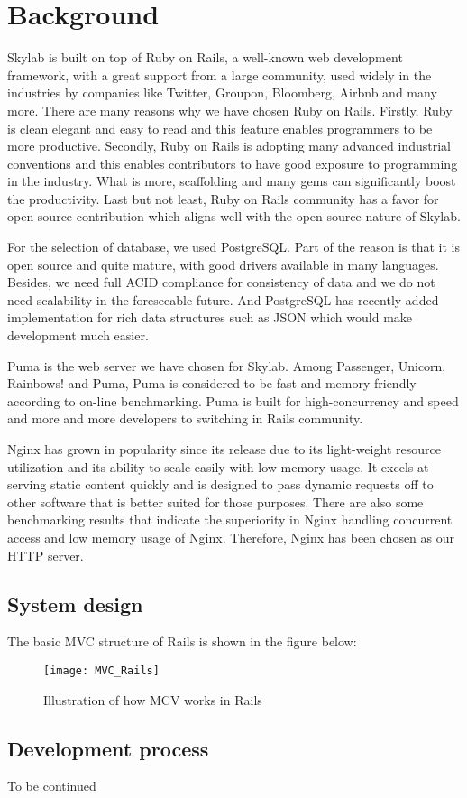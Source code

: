 \chapter{Background}

Skylab is built on top of Ruby on Rails, a well-known web development framework, with a great support from a large community, used widely in the industries by companies like Twitter, Groupon, Bloomberg, Airbnb and many more\cite{citation1}. There are many reasons why we have chosen Ruby on Rails. Firstly, Ruby is clean elegant and easy to read and this feature enables programmers to be more productive. Secondly, Ruby on Rails is adopting many advanced industrial conventions and this enables contributors to have good exposure to programming in the industry. What is more, scaffolding and many gems can significantly boost the productivity. Last but not least, Ruby on Rails community has a favor for open source contribution which aligns well with the open source nature of Skylab.

For the selection of database, we used PostgreSQL. Part of the reason is that it is open source and quite mature, with good drivers available in many languages\cite{citation2}. Besides, we need full ACID compliance for consistency of data and we do not need scalability in the foreseeable future. And PostgreSQL has recently added implementation for rich data structures such as JSON which would make development much easier\cite{citation3}.

Puma is the web server we have chosen for Skylab. Among Passenger, Unicorn, Rainbows! and Puma, Puma is considered to be fast and memory friendly according to on-line benchmarking\cite{citation4}. Puma is built for high-concurrency and speed and more and more developers to switching in Rails community\cite{citation5}.

Nginx has grown in popularity since its release due to its light-weight resource utilization and its ability to scale easily with low memory usage. It excels at serving static content quickly and is designed to pass dynamic requests off to other software that is better suited for those purposes\cite{citation6}. There are also some benchmarking results that indicate the superiority in Nginx handling concurrent access and low memory usage of Nginx\cite{citation7}. Therefore, Nginx has been chosen as our HTTP server.

\section{System design}

The basic MVC structure of Rails is shown in the figure below:
\begin{figure}[h]
\caption{Illustration of how MCV works in Rails}
\centering
\texttt{[image: MVC\_Rails]}
\end{figure}

\section{Development process}

To be continued